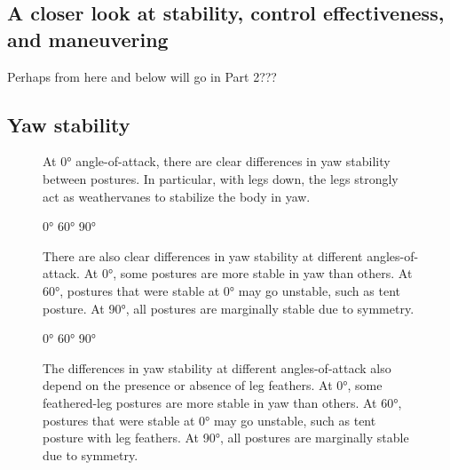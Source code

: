 \subsection*{A closer look at stability, control effectiveness, and maneuvering}
Perhaps from here and below will go in Part 2???
\subsection{Yaw stability}
\begin{figure}
\caption{At \ang{0} angle-of-attack, there are clear differences in yaw stability between postures.  In particular, with legs down, the legs strongly act as weathervanes to stabilize the body in yaw. }
\label{fig:yaw1}
\end{figure}
\begin{figure}
\ang{0} %
\ang{60} %
\ang{90} %
\caption{There are also clear differences in yaw stability at different angles-of-attack. At \ang{0}, some postures are more stable in yaw than others.  At \ang{60}, postures that were stable at \ang{0} may go unstable, such as tent posture.  At \ang{90}, all postures are marginally stable due to symmetry. }
\label{fig:yaw2}
\end{figure}
\begin{figure}
\ang{0} %
\ang{60} %
\ang{90} %
\caption{The differences in yaw stability at different angles-of-attack also depend on the presence or absence of leg feathers. At \ang{0}, some feathered-leg postures are more stable in yaw than others.  At \ang{60}, postures that were stable at \ang{0} may go unstable, such as tent posture with leg feathers.  At \ang{90}, all postures are marginally stable due to symmetry. }
\label{fig:yaw3}
\end{figure}




